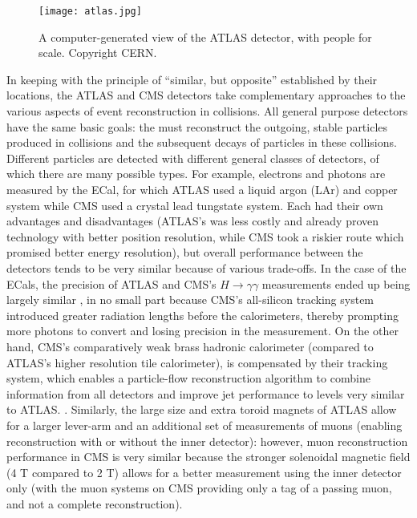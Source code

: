 
\begin{figure}
\centering
\texttt{[image: atlas.jpg]}
\label{fig:detector:atlas}
\caption{A computer-generated view of the ATLAS detector, with people for scale. Copyright CERN.}
\end{figure}



In keeping with the principle of ``similar, but opposite'' established by their locations, the ATLAS and CMS detectors take complementary approaches to the various aspects of event reconstruction in collisions. All general purpose detectors have the same basic goals: the must reconstruct the outgoing, stable particles produced in collisions and the subsequent decays of particles in these collisions. Different particles are detected with different general classes of detectors, of which there are many possible types. For example, electrons and photons are measured by the ECal, for which ATLAS used a liquid argon (LAr) and copper system while CMS used a crystal lead tungstate system. Each had their own advantages and disadvantages (ATLAS's was less costly and already proven technology with better position resolution, while CMS took a riskier route which promised better energy resolution), but overall performance between the detectors tends to be very similar because of various trade-offs. In the case of the ECals, the precision of ATLAS and CMS's $H\rightarrow \gamma \gamma$ measurements ended up being largely similar , in no small part because CMS's all-silicon tracking system introduced greater radiation lengths before the calorimeters, thereby prompting more photons to convert and losing precision in the measurement. On the other hand, CMS's comparatively weak brass hadronic calorimeter (compared to ATLAS's higher resolution tile calorimeter), is compensated by their tracking system, which enables a particle-flow reconstruction algorithm to combine information from all detectors and improve jet performance to levels very similar to ATLAS. . Similarly, the large size and extra toroid magnets of ATLAS allow for a larger lever-arm and an additional set of measurements of muons (enabling reconstruction with or without the inner detector): however, muon reconstruction performance in CMS is very similar because the stronger solenoidal magnetic field (4 T compared to 2 T) allows for a better measurement using the inner detector only (with the muon systems on CMS providing only a tag of a passing muon, and not a complete reconstruction). 


